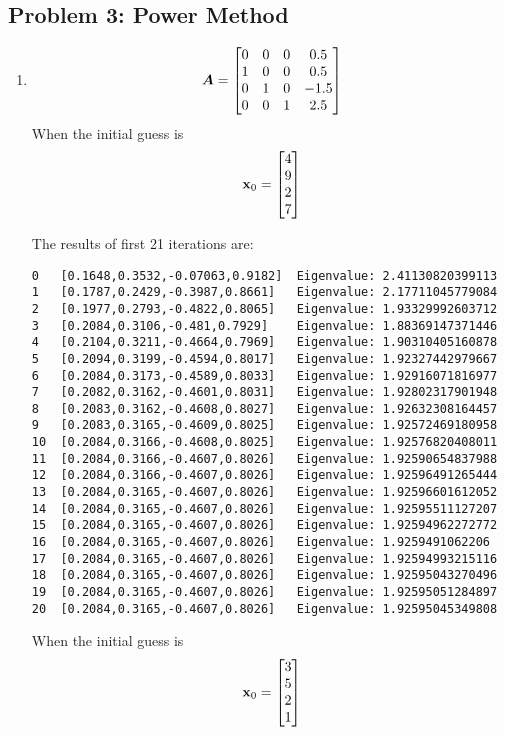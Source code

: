 \documentclass{article}
\begin{document}
\subsection*{{Problem 3: Power Method}}
\label{}
\begin{enumerate} 
\item 
\begin{align}
\boldsymbol{A}=\begin{bmatrix} 0 & 0 & 0 & 0.5   \\  
1 & 0 & 0 & 0.5   \\  
0 & 1 & 0 & -1.5   \\  
0 & 0 & 1 & 2.5  \end{bmatrix}
\end{align}
When the initial guess is 
\begin{align}
\boldsymbol{\mathrm{x}}_0=\begin{bmatrix} 4 \\ 9 \\ 2\\ 7 \end{bmatrix}
\end{align}

The results of first 21 iterations are: 
\begin{verbatim}
0	[0.1648,0.3532,-0.07063,0.9182]	 Eigenvalue: 2.41130820399113
1	[0.1787,0.2429,-0.3987,0.8661]	 Eigenvalue: 2.17711045779084
2	[0.1977,0.2793,-0.4822,0.8065]	 Eigenvalue: 1.93329992603712
3	[0.2084,0.3106,-0.481,0.7929]	 Eigenvalue: 1.88369147371446
4	[0.2104,0.3211,-0.4664,0.7969]	 Eigenvalue: 1.90310405160878
5	[0.2094,0.3199,-0.4594,0.8017]	 Eigenvalue: 1.92327442979667
6	[0.2084,0.3173,-0.4589,0.8033]	 Eigenvalue: 1.92916071816977
7	[0.2082,0.3162,-0.4601,0.8031]	 Eigenvalue: 1.92802317901948
8	[0.2083,0.3162,-0.4608,0.8027]	 Eigenvalue: 1.92632308164457
9	[0.2083,0.3165,-0.4609,0.8025]	 Eigenvalue: 1.92572469180958
10	[0.2084,0.3166,-0.4608,0.8025]	 Eigenvalue: 1.92576820408011
11	[0.2084,0.3166,-0.4607,0.8026]	 Eigenvalue: 1.92590654837988
12	[0.2084,0.3166,-0.4607,0.8026]	 Eigenvalue: 1.92596491265444
13	[0.2084,0.3165,-0.4607,0.8026]	 Eigenvalue: 1.92596601612052
14	[0.2084,0.3165,-0.4607,0.8026]	 Eigenvalue: 1.92595511127207
15	[0.2084,0.3165,-0.4607,0.8026]	 Eigenvalue: 1.92594962272772
16	[0.2084,0.3165,-0.4607,0.8026]	 Eigenvalue: 1.9259491062206
17	[0.2084,0.3165,-0.4607,0.8026]	 Eigenvalue: 1.92594993215116
18	[0.2084,0.3165,-0.4607,0.8026]	 Eigenvalue: 1.92595043270496
19	[0.2084,0.3165,-0.4607,0.8026]	 Eigenvalue: 1.92595051284897
20	[0.2084,0.3165,-0.4607,0.8026]	 Eigenvalue: 1.92595045349808
\end{verbatim}

When the initial guess is 
\begin{align}
\boldsymbol{\mathrm{x}}_0=\begin{bmatrix} 3 \\ 5 \\ 2\\ 1 \end{bmatrix}
\end{align}


\end{enumerate}
\end{document}
